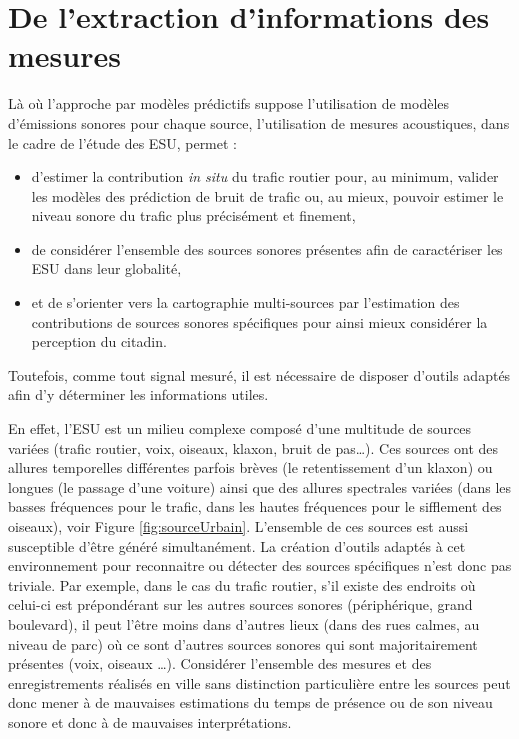 \section{De l'extraction d'informations des mesures}

Là où l'approche par modèles prédictifs suppose l'utilisation de modèles d'émissions sonores pour chaque source, l'utilisation de mesures acoustiques, dans le cadre de l'étude des ESU, permet : 
\begin{itemize}
\item d'estimer la contribution \textit{in situ} du trafic routier pour, au minimum, valider les modèles des prédiction de bruit de trafic ou, au mieux, pouvoir estimer le niveau sonore du trafic plus précisément et finement,
\item de considérer l'ensemble des sources sonores présentes afin de caractériser les ESU dans leur globalité,
\item et de s'orienter vers la cartographie multi-sources par l'estimation des contributions de sources sonores spécifiques pour ainsi mieux considérer la perception du citadin.\\
\end{itemize}

Toutefois, comme tout signal mesuré, il est nécessaire de disposer d'outils adaptés afin d'y déterminer les informations utiles.

En effet, l'ESU est un milieu complexe composé d'une multitude de sources variées (trafic routier, voix, oiseaux, klaxon, bruit de pas\dots). Ces sources ont des allures temporelles différentes parfois brèves (le retentissement d'un klaxon) ou longues (le passage d'une voiture) ainsi que des allures spectrales variées (dans les basses fréquences pour le trafic, dans les hautes fréquences pour le sifflement des oiseaux), voir Figure \ref{fig:sourceUrbain}. L'ensemble de ces sources est aussi susceptible d'être généré simultanément. La création d'outils adaptés à cet environnement pour reconnaitre ou détecter des sources spécifiques n'est donc pas triviale. Par exemple, dans le cas du trafic routier, s'il existe des endroits où celui-ci est prépondérant sur les autres sources sonores (périphérique, grand boulevard), il peut l'être moins dans d'autres lieux (dans des rues calmes, au niveau de parc) où ce sont d'autres sources sonores qui sont majoritairement présentes (voix, oiseaux \dots). Considérer l'ensemble des mesures et des enregistrements réalisés en ville sans distinction particulière entre les sources peut donc mener à de mauvaises estimations du temps de présence ou de son niveau sonore et donc à de mauvaises interprétations. 

